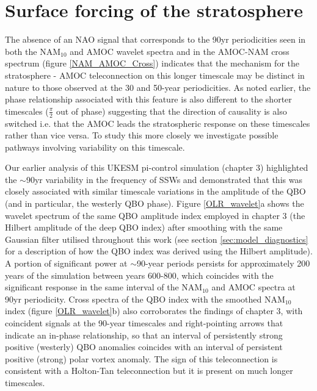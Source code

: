 \section{Surface forcing of the stratosphere}\label{surface-strat_forcing}
The absence of an NAO signal that corresponds to the 90yr periodicities seen in both the NAM$_{10}$ and AMOC wavelet spectra and in the  AMOC-NAM cross spectrum (figure \ref{NAM_AMOC_Cross}) indicates that the mechanism for the stratosphere - AMOC teleconnection on this longer timescale may be distinct in nature to those observed at the 30 and 50-year periodicities. As noted earlier, the phase relationship associated with this feature is also different to the shorter timescales ($\frac{\pi}{2}$ out of phase) suggesting that the direction of causality is also switched i.e. that the AMOC leads the stratospheric response on these timescales rather than vice versa. To study this more closely we investigate possible pathways involving variability on this timescale.

Our earlier analysis of this UKESM pi-control simulation (chapter 3) highlighted the $\sim$90yr variability in the frequency of SSWs and demonstrated that this was closely associated with similar timescale variations in the amplitude of the QBO (and in particular, the westerly QBO phase). Figure \ref{OLR_wavelet}a shows the wavelet spectrum of the same QBO amplitude index employed in chapter 3 (the Hilbert amplitude of the deep QBO index) after smoothing with the same Gaussian filter utilised throughout this work (see section \ref{sec:model_diagnostics} for a description of how the QBO index was derived using the Hilbert amplitude). A portion of significant power at $\sim$90-year periods persists for approximately 200 years of the simulation between years 600-800, which coincides with the significant response in the same interval of the NAM$_{10}$ and AMOC spectra at 90yr periodicity. Cross spectra of the QBO index with the smoothed NAM$_{10}$ index (figure \ref{OLR_wavelet}b) also corroborates the findings of chapter 3, with coincident signals at the 90-year timescales and right-pointing arrows that indicate an in-phase relationship, so that an interval of persistently strong positive (westerly) QBO anomalies coincides with an interval of persistent positive (strong) polar vortex anomaly. The sign of this teleconnection is consistent with a Holton-Tan teleconnection \citep{luDecadalscale2008c, luMechanisms2014c} but it is present on much longer timescales. 

